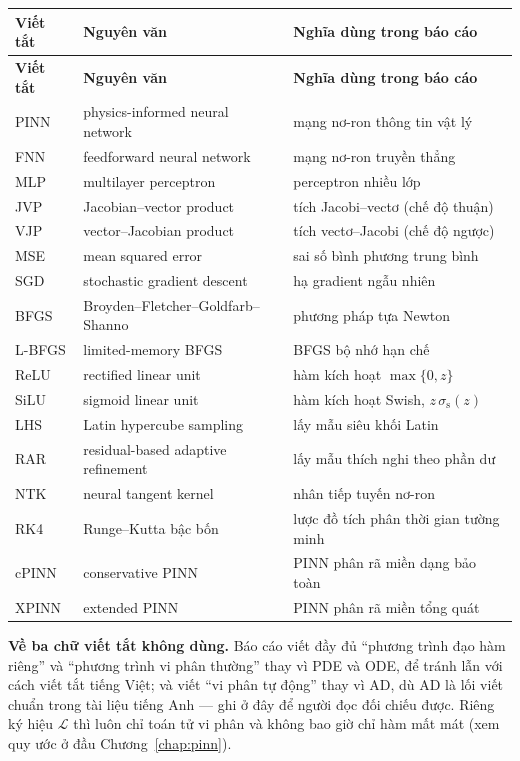 \begin{longtable}{@{}l p{5.3cm} p{6.0cm}@{}}
\toprule
\textbf{Viết tắt} & \textbf{Nguyên văn} & \textbf{Nghĩa dùng trong báo cáo} \\
\midrule
\endfirsthead
\toprule
\textbf{Viết tắt} & \textbf{Nguyên văn} & \textbf{Nghĩa dùng trong báo cáo} \\
\midrule
\endhead
\bottomrule
\endfoot
PINN & physics-informed neural network & mạng nơ-ron thông tin vật lý \\
FNN & feedforward neural network & mạng nơ-ron truyền thẳng \\
MLP & multilayer perceptron & perceptron nhiều lớp \\
JVP & Jacobian--vector product & tích Jacobi--vectơ (chế độ thuận) \\
VJP & vector--Jacobian product & tích vectơ--Jacobi (chế độ ngược) \\
MSE & mean squared error & sai số bình phương trung bình \\
SGD & stochastic gradient descent & hạ gradient ngẫu nhiên \\
BFGS & Broyden--Fletcher--Goldfarb--Shanno & phương pháp tựa Newton \\
L-BFGS & limited-memory BFGS & BFGS bộ nhớ hạn chế \\
ReLU & rectified linear unit & hàm kích hoạt $\max\{0,z\}$ \\
SiLU & sigmoid linear unit & hàm kích hoạt Swish, $z\,\sigma_{\mathrm{s}}(z)$ \\
LHS & Latin hypercube sampling & lấy mẫu siêu khối Latin \\
RAR & residual-based adaptive refinement & lấy mẫu thích nghi theo phần dư \\
NTK & neural tangent kernel & nhân tiếp tuyến nơ-ron \\
RK4 & Runge--Kutta bậc bốn & lược đồ tích phân thời gian tường minh \\
cPINN & conservative PINN & PINN phân rã miền dạng bảo toàn \\
XPINN & extended PINN & PINN phân rã miền tổng quát \\
\bottomrule
\end{longtable}

\begin{center}
\begin{minipage}{0.92\textwidth}
\small
\textbf{Về ba chữ viết tắt không dùng.} Báo cáo viết đầy đủ ``phương trình đạo
hàm riêng'' và ``phương trình vi phân thường'' thay vì PDE và ODE, để tránh lẫn
với cách viết tắt tiếng Việt; và viết ``vi phân tự động'' thay vì AD, dù AD là
lối viết chuẩn trong tài liệu tiếng Anh --- ghi ở đây để người đọc đối chiếu
được. Riêng ký hiệu $\mathcal{L}$ thì luôn chỉ toán tử vi
phân và không bao giờ chỉ hàm mất mát (xem quy ước ở đầu
Chương~\ref{chap:pinn}).
\end{minipage}
\end{center}
